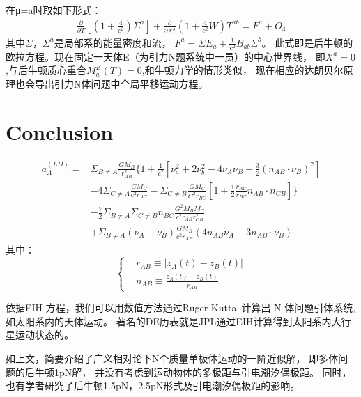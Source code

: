 \documentclass{ctexart}
\begin{document}
在μ=a时取如下形式：
\begin{equation}
  \begin{aligned}
  \frac{\partial}{\partial T} [(1+\frac{4}{c^2}) \Sigma ^a]+
  \frac{\partial}{\partial X^b } (1+\frac{4}{c^2}  W) T^{ab}=F^a+O_4
  \end{aligned}
\end{equation}
其中$\Sigma$，$\Sigma^a$是局部系的能量密度和流，
$F^a=\Sigma E_a+\frac{1}{c^2}  B_{ab} \Sigma^b$。
此式即是后牛顿的欧拉方程。现在固定一天体E（为引力N题系统中一员）的中心世界线，
即$X^a=0$,与后牛顿质心重合$M_a^E (T)=0$,和牛顿力学的情形类似，
现在相应的达朗贝尔原理也会导出引力N体问题中全局平移运动方程。
\section{Conclusion}
\begin{equation}
  \begin{aligned}
a^{(LD)}_A=&\Sigma_{ B \neq A} \frac{GM_B}{r^2_{AB}}\{1+\frac{1}{c^2}[\nu^2_a+2\nu^2_b-4\nu_A\nu_B-\frac{3}{2}(n_{AB} \cdot \nu_B)^2]\\
&-4 \Sigma_{C \neq A} \frac{GM_C}{c^2r_{AC}}-\Sigma_{C \neq B}\frac{GM_C}{C^2r_{BC}}[1+\frac{1}{2}\frac{r_{AC}}{r_{BC}}n_{AB} \cdot n_{CB}]\}\\
&-\frac{7}{2}\Sigma_{ B \neq A} \Sigma_{ C \neq B}n_{BC}\frac{G^2M_B M_C}{c^2 r_{AB} r_{CB}^2}\\
&+\Sigma_{ B \neq A}(\nu_A-\nu_B)\frac{GM_B}{c^2 r_{AB}}(4 n_{AB} \dot \nu_A- 3 n_{AB} \cdot \nu_B)
  \end{aligned}
\end{equation}
其中：
\begin{equation}
   \left\{
     \begin{aligned}
     &r_{AB}\equiv |z_A(t)-z_B(t)|\\
     &n_{AB}\equiv \frac{z_A(t)-z_B(t)}{r_{AB}}
     \end{aligned}
   \right.
\end{equation}
\par 依据EIH 方程，我们可以用数值方法通过Ruger-Kutta~\cite{Ruger97}计算出 N 体问题引体系统,
如太阳系内的天体运动。
著名的DE历表就是JPL通过EIH计算得到太阳系内大行星运动状态的。
\par 如上文，简要介绍了广义相对论下N个质量单极体运动的一阶近似解，
即多体问题的后牛顿1pN解，
并没有考虑到运动物体的多极距与引电潮汐偶极距。
同时，也有学者研究了后牛顿1.5pN，2.5pN形式及引电潮汐偶极距的影响。


\end{document}

